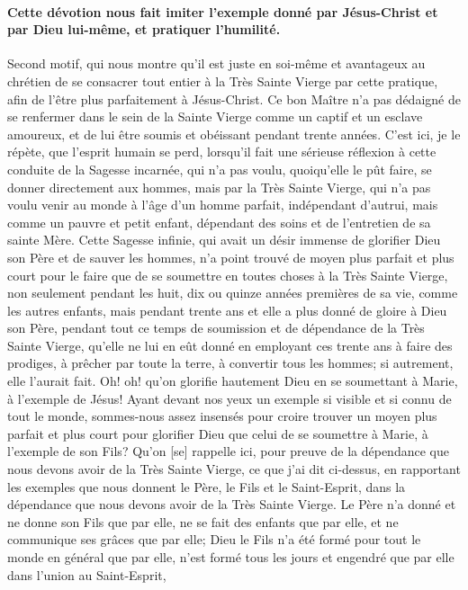 \paragraph{Cette dévotion nous fait imiter l'exemple donné par Jésus-Christ et par Dieu lui-même, et pratiquer l'humilité.}
 Second motif, qui nous montre qu'il est juste en soi-même et avantageux au chrétien de se consacrer tout
entier à la Très Sainte Vierge par cette pratique, afin de l'être plus parfaitement à Jésus-Christ.
Ce bon Maître n'a pas dédaigné de se renfermer dans le sein de la Sainte Vierge comme un captif et un esclave
amoureux, et de lui être soumis et obéissant pendant trente années. C'est ici, je le répète, que l'esprit humain se
perd, lorsqu'il fait une sérieuse réflexion à cette conduite de la Sagesse incarnée, qui n'a pas voulu, quoiqu'elle le
pût faire, se donner directement aux hommes, mais par la Très Sainte Vierge, qui n'a pas voulu venir au monde à
l'âge d'un homme parfait, indépendant d'autrui, mais comme un pauvre et petit enfant, dépendant des soins et de
l'entretien de sa sainte Mère. Cette Sagesse infinie, qui avait un désir immense de glorifier Dieu son Père et de
sauver les hommes, n'a point trouvé de moyen plus parfait et plus court pour le faire que de se soumettre en
toutes choses à la Très Sainte Vierge, non seulement pendant les huit, dix ou quinze années premières de sa vie,
comme les autres enfants, mais pendant trente ans et elle a plus donné de gloire à Dieu son Père, pendant tout ce
temps de soumission et de dépendance de la Très Sainte Vierge, qu'elle ne lui en eût donné en employant ces
trente ans à faire des prodiges, à prêcher par toute la terre, à convertir tous les hommes; si autrement, elle l'aurait
fait. Oh! oh! qu'on glorifie hautement Dieu en se soumettant à Marie, à l'exemple de Jésus!
Ayant devant nos yeux un exemple si visible et si connu de tout le monde, sommes-nous assez insensés pour
croire trouver un moyen plus parfait et plus court pour glorifier Dieu que celui de se soumettre à Marie, à l'exemple
de son Fils?
 Qu'on [se] rappelle ici, pour preuve de la dépendance que nous devons avoir de la Très Sainte Vierge, ce
que j'ai dit ci-dessus, en rapportant les exemples que nous donnent le Père, le Fils et le Saint-Esprit, dans la
dépendance que nous devons avoir de la Très Sainte Vierge. Le Père n'a donné et ne donne son Fils que par elle,
ne se fait des enfants que par elle, et ne communique ses grâces que par elle; Dieu le Fils n'a été formé pour tout
le monde en général que par elle, n'est formé tous les jours et engendré que par elle dans l'union au Saint-Esprit,
